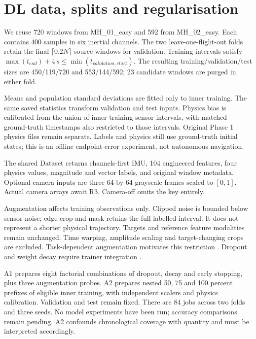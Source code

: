\section{DL data, splits and regularisation}
We reuse 720 windows from MH\_01\_easy and 592 from MH\_02\_easy.
Each contains 400 samples in six inertial channels. The two leave-one-flight-out
folds retain the final $\lceil0.2N\rceil$ source windows for validation.
Training intervals satisfy $\max(t_{end})+4\,s\leq\min(t_{validation,start})$.
The resulting training/validation/test sizes are 450/119/720 and 553/144/592;
23 candidate windows are purged in either fold.

Means and population standard deviations are fitted only to inner training.
The same saved statistics transform validation and test inputs. Physics bias is
calibrated from the union of inner-training sensor intervals, with matched
ground-truth timestamps also restricted to those intervals. Original Phase 1
physics files remain separate. Labels and physics still use ground-truth initial
states; this is an offline endpoint-error experiment, not autonomous navigation.

The shared Dataset returns channels-first IMU, 104 engineered features, four
physics values, magnitude and vector labels, and original window metadata.
Optional camera inputs are three 64-by-64 grayscale frames scaled to $[0,1]$.
Actual camera arrays await R3. Camera-off omits the key entirely.

Augmentation affects training observations only. Clipped noise is bounded below
sensor noise; edge crop-and-mask retains the full labelled interval. It does not
represent a shorter physical trajectory. Targets and reference feature modalities
remain unchanged. Time warping, amplitude scaling and target-changing crops are
excluded. Task-dependent augmentation motivates this restriction
\cite{iwana2021,wen2021}. Dropout and weight decay require trainer integration
\cite{srivastava2014,loshchilov2019}.

A1 prepares eight factorial combinations of dropout, decay and early stopping,
plus three augmentation probes. A2 prepares nested 50, 75 and 100 percent prefixes
of eligible inner training, with independent scalers and physics calibration.
Validation and test remain fixed. There are 84 jobs across two folds and three
seeds. No model experiments have been run; accuracy comparisons remain pending.
A2 confounds chronological coverage with quantity and must be interpreted accordingly.
